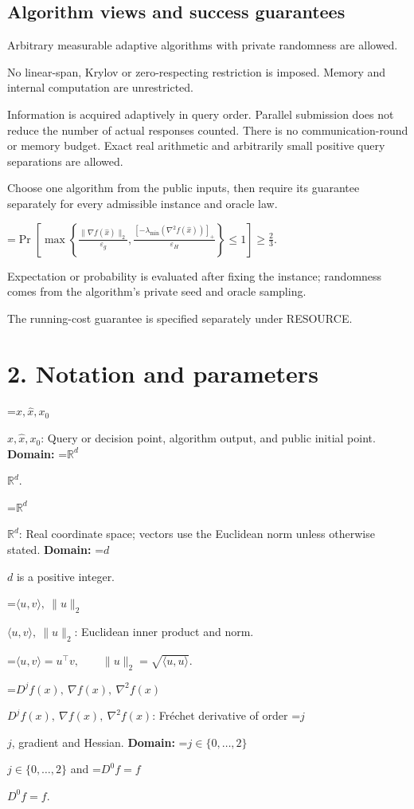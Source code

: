 \documentclass[10pt,a4paper]{article}
\newcommand{\AtlasMath}[1]{\par\begingroup\centering\setbox0=\hbox{$\displaystyle #1$}\ifdim\wd0>1.4\linewidth\typeout{ATLAS WIDE FORMULA: \the\wd0}\fi\ifdim\wd0>\linewidth\resizebox{\linewidth}{!}{\box0}\else\box0\fi\par\endgroup}
\newcommand{\AtlasInlineMath}[1]{\begingroup\setbox0=\hbox{$#1$}\ifdim\wd0>.4\linewidth\endgroup\AtlasMath{#1}\else\endgroup$#1$\fi}
\begin{document}
\subsection{Algorithm views and success guarantees}
Arbitrary measurable adaptive algorithms with private randomness are allowed.

No linear-span, Krylov or zero-respecting restriction is imposed. Memory and internal computation are unrestricted.

Information is acquired adaptively in query order. Parallel submission does not reduce the number of actual responses counted. There is no communication-round or memory budget. Exact real arithmetic and arbitrarily small positive query separations are allowed.

Choose one algorithm from the public inputs, then require its guarantee separately for every admissible instance and oracle law.


\AtlasMath{\Pr\!\left[\max\left\{\frac{\|\nabla f(\widehat{x})\|_2}{\varepsilon_g},\frac{[-\lambda_{\min}(\nabla^2f(\widehat{x}))]_+}{\varepsilon_H}\right\}\le 1\right]\ge\frac23.}


Expectation or probability is evaluated after fixing the instance; randomness comes from the algorithm's private seed and oracle sampling.

The running-cost guarantee is specified separately under RESOURCE.

\section{2. Notation and parameters}
\AtlasInlineMath{x,\widehat{x},x_0}: Query or decision point, algorithm output, and public initial point. \textbf{Domain:} \AtlasInlineMath{\mathbb{R}^d}.

\AtlasInlineMath{\mathbb{R}^d}: Real coordinate space; vectors use the Euclidean norm unless otherwise stated. \textbf{Domain:} \AtlasInlineMath{d} is a positive integer.

\AtlasInlineMath{\langle u,v\rangle,\ \|u\|_2}: Euclidean inner product and norm.


\AtlasMath{\langle u,v\rangle=u^\top v,\qquad\|u\|_2=\sqrt{\langle u,u\rangle}.}


\AtlasInlineMath{D^jf(x),\ \nabla f(x),\ \nabla^2f(x)}: Fréchet derivative of order \AtlasInlineMath{j}, gradient and Hessian. \textbf{Domain:} \AtlasInlineMath{j\in\{0,\ldots,2\}} and \AtlasInlineMath{D^0f=f}.
\end{document}
